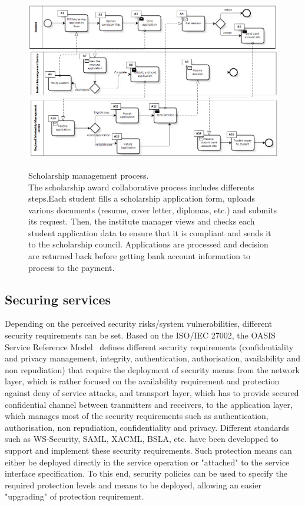\documentclass[runningheads,a4paper]{llncs}
\begin{document}
\begin{figure}
\centering
\includegraphics[height=220pt, width=\linewidth]{scholarshipBP.png}
\caption[Scholarship management process]{Scholarship management process.\\ The scholarship award collaborative process includes differents steps.Each student fills a scholarship application form, uploads various documents (resume, cover letter, diplomas, etc.) and submits its request. Then, the institute manager views and checks each student application data to ensure that it is compliant and sends it to the scholarship council. Applications are processed and decision are returned back before getting bank account information to process to the payment.}
\label{fig:bp}
\end{figure}
\subsection{Securing services}
Depending on the perceived security risks/system vulnerabilities, different security requirements can be set. Based on the ISO/IEC 27002, the OASIS Service Reference Model~\cite{OAS06} defines different security requirements (confidentiality and privacy management, integrity, authentication, authorisation, availability and non repudiation) that require the deployment of security means from the network layer, which is rather focused on the availability requirement and protection against deny of service attacks, and transport layer, which has to provide secured confidential channel between tranmitters and receivers, to the application layer, which manages most of the security requirements such as authentication, authorisation, non repudiation, confidentiality and privacy. Different standards such as WS-Security, SAML, XACML, BSLA, etc. have been developped to support and implement these security requirements.
Such protection means can either be deployed directly in the service operation or "attached" to the service interface specification. To this end, security policies can be used to specify the required protection levels and means to be deployed, allowing an easier "upgrading" of protection requirement. 
\end{document}
